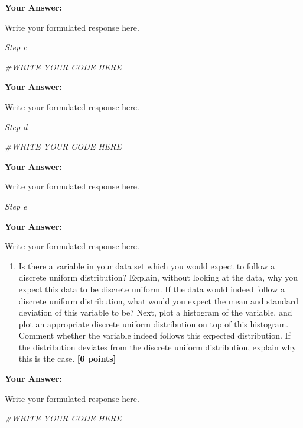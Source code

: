 \documentclass[
]{article}
\newenvironment{Shaded}{\begin{snugshade}}{\end{snugshade}}
\newcommand{\CommentTok}[1]{\textcolor[rgb]{0.56,0.35,0.01}{\textit{#1}}}
\providecommand{\tightlist}{%
  \setlength{\itemsep}{0pt}\setlength{\parskip}{0pt}}
\begin{document}
\textbf{Your Answer:}

Write your formulated response here.

\emph{Step c}

\begin{Shaded}
\begin{Highlighting}[]
\CommentTok{\#WRITE YOUR CODE HERE}
\end{Highlighting}
\end{Shaded}

\textbf{Your Answer:}

Write your formulated response here.

\emph{Step d}

\begin{Shaded}
\begin{Highlighting}[]
\CommentTok{\#WRITE YOUR CODE HERE}
\end{Highlighting}
\end{Shaded}

\textbf{Your Answer:}

Write your formulated response here.

\emph{Step e}

\textbf{Your Answer:}

Write your formulated response here.

\begin{enumerate}
\def\labelenumi{\arabic{enumi}.}
\setcounter{enumi}{2}
\tightlist
\item
  Is there a variable in your data set which you would expect to follow
  a discrete uniform distribution? Explain, without looking at the data,
  why you expect this data to be discrete uniform. If the data would
  indeed follow a discrete uniform distribution, what would you expect
  the mean and standard deviation of this variable to be? Next, plot a
  histogram of the variable, and plot an appropriate discrete uniform
  distribution on top of this histogram. Comment whether the variable
  indeed follows this expected distribution. If the distribution
  deviates from the discrete uniform distribution, explain why this is
  the case. \textbf{[6 points]}
\end{enumerate}

\textbf{Your Answer:}

Write your formulated response here.

\begin{Shaded}
\begin{Highlighting}[]
\CommentTok{\#WRITE YOUR CODE HERE}
\end{Highlighting}
\end{Shaded}
\end{document}
